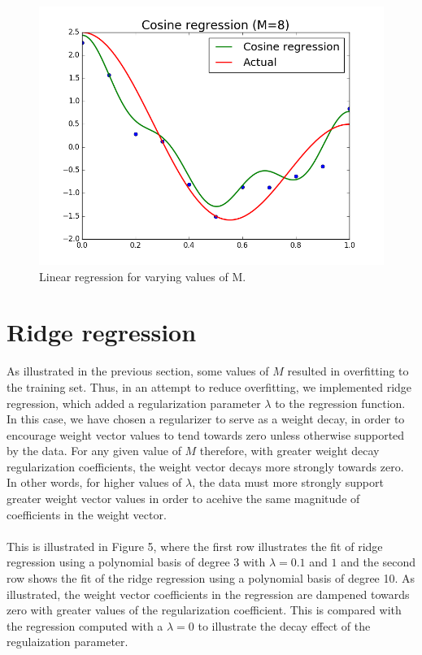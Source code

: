\documentclass{article}
\begin{document}
\begin{figure}[width=\linewidth]
\begin{multicols}{2}
  \includegraphics[width=1.2\linewidth]{code/P2/cosine_regression,8.png}
\end{multicols}
\caption{Linear regression for varying values of M.}
\end{figure}


\section{Ridge regression}
As illustrated in the previous section, some values of $M$ resulted in overfitting to the training set. Thus, in an attempt to reduce overfitting, we implemented ridge regression, which added a regularization parameter $\lambda$ to the regression function. In this case, we have chosen a regularizer to serve as a weight decay, in order to encourage weight vector values to tend towards zero unless otherwise supported by the data. For any given value of $M$ therefore, with greater weight decay regularization coefficients, the weight vector decays more strongly towards zero. In other words, for higher values of $\lambda$, the data must more strongly support greater weight vector values in order to acehive the same magnitude of coefficients in the weight vector. \\ \\
This is illustrated in Figure 5, where the first row illustrates the fit of ridge regression using a polynomial basis of degree 3 with $\lambda = 0.1$ and $1$ and the second row shows the fit of the ridge regression using a polynomial basis of degree 10. As illustrated, the weight vector coefficients in the regression are dampened towards zero with greater values of the regularization coefficient. This is compared with the regression computed with a $\lambda = 0$ to illustrate the decay effect of the regulaization parameter.
\end{document}
